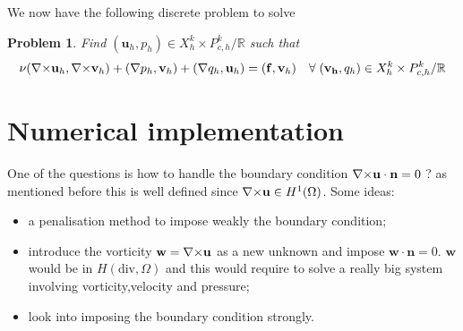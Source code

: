 \documentclass{article}
\newtheorem{problem}{Problem}
\newcommand{\ST}{\ensuremath{\; | \;}\xspace}
\newcommand{\Hdiv}{\ensuremath{H(\mathrm{div},\Omega)}\xspace}
\newcommand{\Pkch}{\ensuremath{P^k_{c,h}}\xspace}
\newcommand{\Hp}[1][1]{\ensuremath{H^{#1}(\Omega)}\xspace}
\begin{document}

We now have the following discrete problem to solve
\begin{problem}
  \label{prob:3}
  Find $(\mathbf{u}_h,p_h) \in X^k_{h} \times \Pkch/\mathbb{R}$ such that
  \begin{equation}
    \label{eq:18}
    \nu (\curl \mathbf{u}_h, \curl \mathbf{v}_h ) + (\nabla p_h, \mathbf{v}_h) + (\nabla
    q_h, \mathbf{u}_h ) = (\mathbf{f}, \mathbf{v}_h)\quad \forall\;
    (\mathbf{v_h},q_h) \in X^k_{h} \times \Pkch/\mathbb{R}
  \end{equation}
\end{problem}


\section{Numerical implementation}

One of the questions is how to handle the boundary condition ${\nabla\times} \mathbf{u}
\cdot \mathbf{n} = 0$ ? as mentioned before this is well defined since $\curl
\mathbf{u} \in \Hp$.
Some ideas:
\begin{itemize}
\item a penalisation method to impose weakly the boundary condition;
\item introduce the vorticity $\mathbf{w} = {\nabla\times} \mathbf{u}$ as a new unknown
  and impose $\mathbf{w}\cdot \mathbf{n} = 0$. $\mathbf{w}$ would be in $\Hdiv$
  and this would require to solve a really big system involving
  vorticity,velocity and pressure;
\item look into imposing the boundary condition strongly.
\end{itemize}




\end{document}
